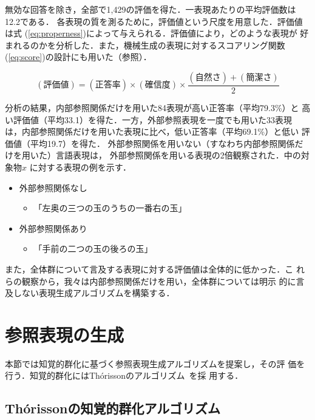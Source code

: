 \documentclass{nlp}
\begin{document}
無効な回答を除き，全部で1,429の評価を得た．一表現あたりの平均評価数は
12.2である．
各表現の質を測るために，評価値という尺度を用意した．評価値は式
(\ref{eq:properness})によって与えられる．評価値により，どのような表現が
好まれるのかを分析した．また，機械生成の表現に対するスコアリング関数
(\ref{eq:score})の設計にも用いた（参照）．

 \begin{equation}
 (\mbox{評価値})=
  (\mbox{正答率})\times(\mbox{確信度})\times\frac{(\mbox{自然さ})+(\mbox{簡潔さ})}{2}
 \label{eq:properness}
 \end{equation}

分析の結果，内部参照関係だけを用いた84表現が高い正答率（平均79.3\%）と
高い評価値（平均33.1）を得た．一方，外部参照表現を一度でも用いた33表現
は，内部参照関係だけを用いた表現に比べ，低い正答率（平均69.1\%）と低い
評価値（平均19.7）を得た．
外部参照関係を用いない（すなわち内部参照関係だけを用いた）言語表現は，
外部参照関係を用いる表現の2倍観察された．中の対象物$x$
に対する表現の例を示す．


\begin{itemize}
\item 外部参照関係なし
  \begin{itemize}
  \item 「左奥の三つの玉のうちの一番右の玉」
  \end{itemize}
\item 外部参照関係あり
  \begin{itemize}
  \item 「手前の二つの玉の後ろの玉」
  \end{itemize}
\end{itemize}

また，全体群について言及する表現に対する評価値は全体的に低かった．こ
れらの観察から，我々は内部参照関係だけを用い，全体群については明示
的に言及しない表現生成アルゴリズムを構築する．

\section{参照表現の生成}
\label{sec:generation}

本節では知覚的群化に基づく参照表現生成アルゴリズムを提案し，その評
価を行う．知覚的群化にはTh\'{o}rissonのアルゴリズム~\cite{KT1994}を採
用する．

\subsection{Th\'{o}rissonの知覚的群化アルゴリズム}
\label{sec:grouping-algorithm}
\end{document}
